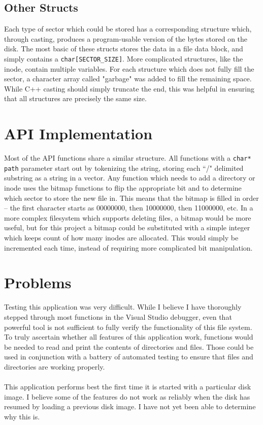 \documentclass[]{article}
\begin{document}
\subsection{Other Structs}
Each type of sector which could be stored has a corresponding structure which, through casting, produces a program-usable version of the bytes stored on the disk. The most basic of these structs stores the data in a file data block, and simply contains a \texttt{char[SECTOR\_SIZE]}. More complicated structures, like the inode, contain multiple variables. For each structure which does not fully fill the sector, a character array called "garbage" was added to fill the remaining space. While C++ casting should simply truncate the end, this was helpful in ensuring that all structures are precisely the same size.

\section{API Implementation}
Most of the API functions share a similar structure. All functions with a \texttt{char* path} parameter start out by tokenizing the string, storing each ``/" delimited substring as a string in a vector. Any function which needs to add a directory or inode uses the bitmap functions to flip the appropriate bit and to determine which sector to store the new file in. This means that the bitmap is filled in order -- the first character starts as 00000000, then 10000000, then 11000000, etc. In a more complex filesystem which supports deleting files, a bitmap would be more useful, but for this project a bitmap could be substituted with a simple integer which keeps count of how many inodes are allocated. This would simply be incremented each time, instead of requiring more complicated bit manipulation.

\section{Problems} \label{sec:problems}
Testing this application was very difficult. While I believe I have thoroughly stepped through most functions in the Visual Studio debugger, even that powerful tool is not sufficient to fully verify the functionality of this file system. To truly ascertain whether all features of this application work, functions would be needed to read and print the contents of directories and files. Those could be used in conjunction with a battery of automated testing to ensure that files and directories are working properly.
\\ \\
This application performs best the first time it is started with a particular disk image. I believe some of the features do not work as reliably when the disk has resumed by loading a previous disk image. I have not yet been able to determine why this is.
\end{document}
